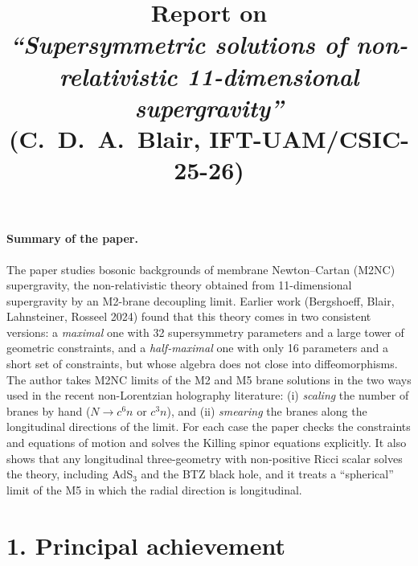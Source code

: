 \documentclass[11pt]{article}
\title{Report on\\[4pt] \emph{``Supersymmetric solutions of non-relativistic 11-dimensional supergravity''}\\[2pt] \large (C.~D.~A.~Blair, IFT-UAM/CSIC-25-26)}
\date{}
\begin{document}
\maketitle
\vspace{-2em}

\paragraph{Summary of the paper.}
The paper studies bosonic backgrounds of membrane Newton--Cartan (M2NC) supergravity, the
non-relativistic theory obtained from 11-dimensional supergravity by an M2-brane decoupling
limit. Earlier work (Bergshoeff, Blair, Lahnsteiner, Rosseel 2024) found that this theory comes
in two consistent versions: a \emph{maximal} one with 32 supersymmetry parameters and a large
tower of geometric constraints, and a \emph{half-maximal} one with only 16 parameters and a
short set of constraints, but whose algebra does not close into diffeomorphisms. The author
takes M2NC limits of the M2 and M5 brane solutions in the two ways used in the recent
non-Lorentzian holography literature: (i) \emph{scaling} the number of branes by hand
($N\to c^6 n$ or $c^3 n$), and (ii) \emph{smearing} the branes along the longitudinal
directions of the limit. For each case the paper checks the constraints and equations of
motion and solves the Killing spinor equations explicitly. It also shows that any
longitudinal three-geometry with non-positive Ricci scalar solves the theory, including
AdS$_3$ and the BTZ black hole, and it treats a ``spherical'' limit of the M5 in which the
radial direction is longitudinal.

\section*{1. Principal achievement}
\end{document}
